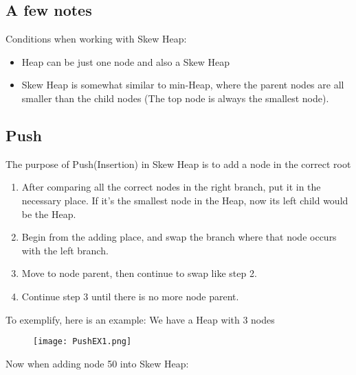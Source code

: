 \documentclass[12pt, a4paper]{article}
\begin{document}
\subsection{A few notes}
Conditions when working with Skew Heap:
\begin{itemize}
    \item Heap can be just one node and also a Skew Heap
    \item Skew Heap is somewhat similar to min-Heap, where the parent nodes are all smaller than the child nodes (The top node is always the smallest node).
\end{itemize}
\subsection{Push}
The purpose of Push(Insertion) in Skew Heap is to add a node in the correct root
\begin{enumerate}
    \item After comparing all the correct nodes in the right branch, put it in the necessary place. If it’s the smallest node in the Heap, now its left child would be the Heap.
    \item Begin from the adding place, and swap the branch where that node occurs with the left branch.
    \item Move to node parent, then continue to swap like step 2.
    \item Continue step 3 until there is no more node parent.
\end{enumerate}
To exemplify, here is an example:
We have a Heap with 3 nodes
\begin{figure}[H]
    \begin{center}
        \texttt{[image: PushEX1.png]}
    \end{center}
\end{figure}
Now when adding node 50 into Skew Heap:
\end{document}
